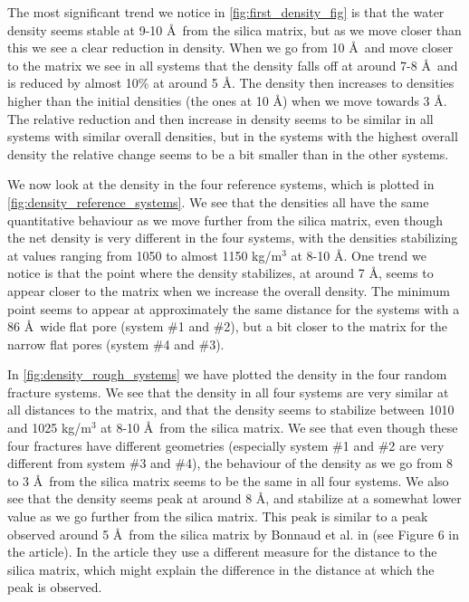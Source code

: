 The most significant trend we notice in \cref{fig:first_density_fig} is that the water density seems stable at 9-10 \AA\ from the silica matrix, but as we move closer than this we see a clear reduction in density. When we go from 10 \AA\ and move closer to the matrix we see in all systems that the density falls off at around 7-8 \AA\, and is reduced by almost 10\% at around 5 \AA. The density then increases to densities higher than the initial densities (the ones at 10 \AA) when we move towards 3 \AA. The relative reduction and then increase in density seems to be similar in all systems with similar overall densities, but in the systems with the highest overall density the relative change seems to be a bit smaller than in the other systems.

We now look at the density in the four reference systems, which is plotted in \cref{fig:density_reference_systems}. We see that the densities all have the same quantitative behaviour as we move further from the silica matrix, even though the net density is very different in the four systems, with the densities stabilizing at values ranging from 1050 to almost 1150 kg/m$^3$ at 8-10 \AA. One trend we notice is that the point where the density stabilizes, at around 7 \AA, seems to appear closer to the matrix when we increase the overall density. The minimum point seems to appear at approximately the same distance for the systems with a 86 \AA\ wide flat pore (system \#1 and \#2), but a bit closer to the matrix for the narrow flat pores (system \#4 and \#3).

In \cref{fig:density_rough_systems} we have plotted the density in the four random fracture systems. We see that the density in all four systems are very similar at all distances to the matrix, and that the density seems to stabilize between 1010 and 1025 kg/m$^3$ at 8-10 \AA\ from the silica matrix. We see that even though these four fractures have different geometries (especially system \#1 and \#2 are very different from system \#3 and \#4), the behaviour of the density as we go from 8 to 3 \AA\ from the silica matrix seems to be the same in all four systems. We also see that the density seems peak at around 8 \AA, and stabilize at a somewhat lower value as we go further from the silica matrix. This peak is similar to a peak observed around 5 \AA\ from the silica matrix by Bonnaud et al. in \cite{bonnaud2010molecular} (see Figure 6 in the article). In the article they use a different measure for the distance to the silica matrix, which might explain the difference in the distance at which the peak is observed.

